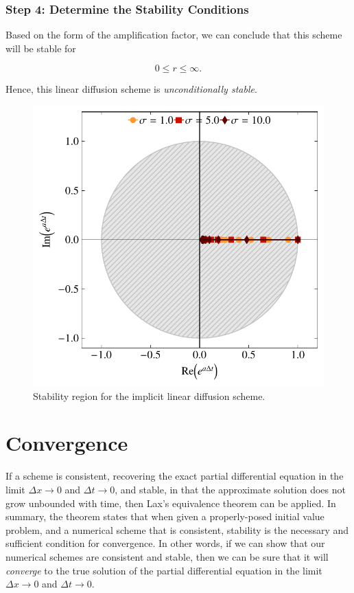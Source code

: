 \subsubsection{Step 4: Determine the Stability Conditions}
Based on the form of the amplification factor, we can conclude that this scheme will be stable for
\begin{eqBox}
\begin{equation}
	0 \leq r \leq \infty.
\end{equation}
\end{eqBox}
Hence, this linear diffusion scheme is {\it unconditionally stable}.
\begin{figure}[htbp]
	\centering
	\includegraphics[width=0.6\linewidth]{Pictures/implicit_diffusion}
	\caption{Stability region for the implicit linear diffusion scheme.}
	\label{fig:implicit_diffusion}
\end{figure}

\section{Convergence}
If a scheme is consistent, recovering the exact partial differential equation in the limit $\Delta x \rightarrow 0$ and $\Delta t \rightarrow 0$, and stable, in that the approximate solution does not grow unbounded with time, then Lax's equivalence theorem can be applied. In summary, the theorem states that when given a properly-posed initial value problem, and a numerical scheme that is consistent, stability is the necessary and sufficient condition for convergence. In other words, if we can show that our numerical schemes are consistent and stable, then we can be sure that it will {\it converge} to the true solution of the partial differential equation in the limit $\Delta x \rightarrow 0$ and $\Delta t \rightarrow 0$.

